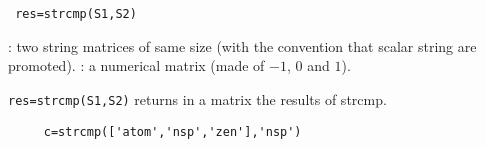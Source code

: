 
\begin{mandesc}
\end{mandesc}
\begin{calling_sequence}
\begin{verbatim}
 res=strcmp(S1,S2)  
\end{verbatim}
\end{calling_sequence}
\begin{parameters}
  \begin{varlist}
    : two string matrices of same size (with the convention that
  scalar string are promoted).
    : a numerical matrix (made of $-1$, $0$ and $1$).
  \end{varlist}
\end{parameters}
\begin{mandescription}
  \verb!res=strcmp(S1,S2)! returns in a matrix the results of strcmp.
\end{mandescription}
\begin{examples}
  \begin{Verbatim}
     c=strcmp(['atom','nsp','zen'],'nsp')
  \end{Verbatim}
\end{examples}
\begin{manseealso}
\end{manseealso}

